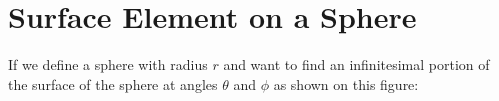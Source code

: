 

\section{Surface Element on a Sphere} \label{subsect: Surface Element on a Sphere}

If we define a sphere with radius $r$ and want to find an infinitesimal portion of the surface of the sphere at angles ${\theta}$ and ${\phi}$ as shown on this figure:

